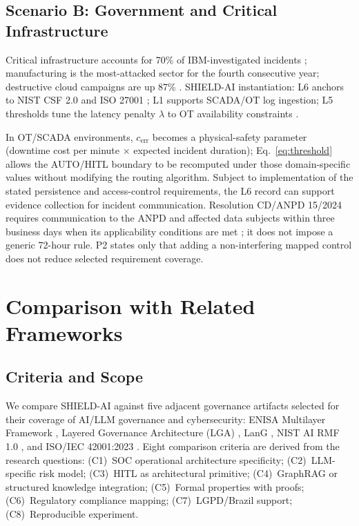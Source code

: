 \documentclass[journal]{IEEEtran}
\begin{document}
\subsection{Scenario B: Government and Critical Infrastructure}
Critical infrastructure accounts for 70\% of IBM-investigated incidents \cite{xforce2025};
manufacturing is the most-attacked sector for the fourth consecutive year; destructive cloud
campaigns are up 87\% \cite{mddr2025}. SHIELD-AI instantiation: L6 anchors to NIST CSF 2.0
\cite{nist2024csf} and ISO 27001 \cite{iso27001}; L1 supports SCADA/OT log ingestion; L5
thresholds tune the latency penalty $\lambda$ to OT availability constraints
\cite{nsa2024deploying}.

In OT/SCADA environments, $c_{\text{err}}$ becomes a physical-safety parameter
(downtime cost per minute $\times$ expected incident duration); Eq.~\eqref{eq:threshold}
allows the AUTO/HITL boundary to be recomputed under those domain-specific values without
modifying the routing algorithm. Subject to implementation of the stated persistence and
access-control requirements, the L6 record can support evidence collection for incident
communication. Resolution CD/ANPD 15/2024 requires communication to the ANPD and affected
data subjects within three business days when its applicability conditions are met
\cite{anpd15}; it does not impose a generic 72-hour rule. P2 states only that adding a
non-interfering mapped control does not reduce selected requirement coverage.

\section{Comparison with Related Frameworks}
\label{sec:comparison}

\subsection{Criteria and Scope}
We compare SHIELD-AI against five adjacent governance artifacts selected for their coverage
of AI/LLM governance and cybersecurity: ENISA Multilayer Framework \cite{enisa2023multilayer},
Layered Governance Architecture (LGA) \cite{lga2026}, LanG \cite{lang2026},
NIST AI RMF 1.0 \cite{nist2023airmf}, and ISO/IEC 42001:2023 \cite{iso42001}.
Eight comparison criteria are derived from the research questions: (C1)~SOC operational
architecture specificity; (C2)~LLM-specific risk model; (C3)~HITL as architectural
primitive; (C4)~GraphRAG or structured knowledge integration; (C5)~Formal properties
with proofs; (C6)~Regulatory compliance mapping; (C7)~LGPD/Brazil support; (C8)~Reproducible
experiment.
\end{document}
